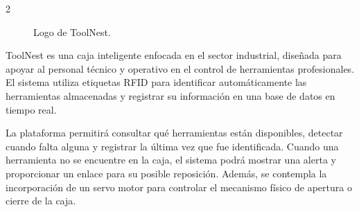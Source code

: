 \begin{multicols}{2}
\begin{figure}[H]
    \centering
    
    \caption{Logo de ToolNest.}
    \label{fig:toolnest-logo}
\end{figure}

ToolNest es una caja inteligente enfocada en el sector industrial, diseñada para apoyar al personal técnico y operativo en el control de herramientas profesionales. El sistema utiliza etiquetas RFID para identificar automáticamente las herramientas almacenadas y registrar su información en una base de datos en tiempo real. 

\vspace{0.5em}

La plataforma permitirá consultar qué herramientas están disponibles, detectar cuando falta alguna y registrar la última vez que fue identificada. Cuando una herramienta no se encuentre en la caja, el sistema podrá mostrar una alerta y proporcionar un enlace para su posible reposición. Además, se contempla la incorporación de un servo motor para controlar el mecanismo físico de apertura o cierre de la caja.
\end{multicols}


